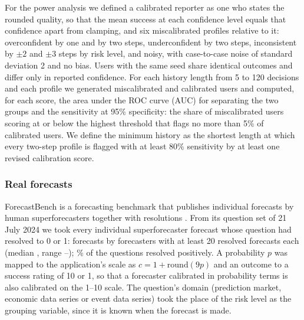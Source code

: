 \documentclass[12pt,a4paper]{article}
\begin{document}
For the power analysis we defined a calibrated reporter as one who states the rounded quality, so that the mean success at each confidence level equals that confidence apart from clamping, and six miscalibrated profiles relative to it: overconfident by one and by two steps, underconfident by two steps, inconsistent by $\pm2$ and $\pm3$ steps by risk level, and noisy, with case-to-case noise of standard deviation 2 and no bias. Users with the same seed share identical outcomes and differ only in reported confidence. For each history length from 5 to 120 decisions and each profile we generated \PowerReps{} miscalibrated and \PowerReps{} calibrated users and computed, for each score, the area under the ROC curve (AUC) for separating the two groups \cite{fawcett2006} and the sensitivity at 95\% specificity: the share of miscalibrated users scoring at or below the highest threshold that flags no more than 5\% of calibrated users. We define the minimum history as the shortest length at which every two-step profile is flagged with at least 80\% sensitivity by at least one revised calibration score.

\subsubsection{Real forecasts}\label{sec:replay}

ForecastBench is a forecasting benchmark that publishes individual forecasts by human superforecasters together with resolutions \cite{karger2025}. From its question set of 21 July 2024 we took every individual superforecaster forecast whose question had resolved to 0 or 1: \ReplayForecasts{} forecasts by \ReplayForecasters{} forecasters with at least 20 resolved forecasts each (median \ReplayMedianPer{}, range \ReplayMinPer{}--\ReplayMaxPer{}); \ReplayBaseRate\% of the questions resolved positively. A probability $p$ was mapped to the application's scale as $c=1+\mathrm{round}(9p)$ and an outcome to a success rating of 10 or 1, so that a forecaster calibrated in probability terms is also calibrated on the 1--10 scale. The question's domain (prediction market, economic data series or event data series) took the place of the risk level as the grouping variable, since it is known when the forecast is made.
\end{document}

